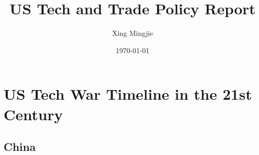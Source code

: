 \usepackage{sectsty}
\allsectionsfont{\rmfamily\bfseries\upshape} %

\usepackage[nottoc,notlof,notlot]{tocbibind} %
\usepackage[titles,subfigure]{tocloft} %
\renewcommand{\cftsecfont}{\rmfamily\mdseries\upshape}
\renewcommand{\cftsecpagefont}{\rmfamily\mdseries\upshape} %

\usepackage[colorlinks,citecolor=black,urlcolor=black,bookmarks=false,hypertexnames=true]{hyperref} 




\title{US Tech and Trade Policy Report}
\author{Xing Mingjie}
\date{\today} %


\maketitle

\tableofcontents

\newpage





\section{US Tech War Timeline in the 21st Century}
	\subsection{China}
